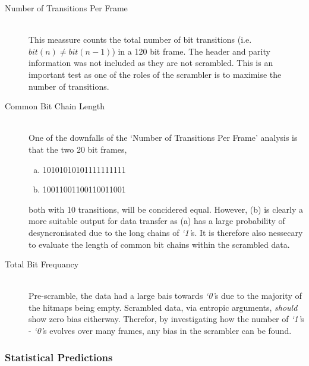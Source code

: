 			\begin{description}
				\item[Number of Transitions Per Frame] \hfill \\
					This meassure counts the total number of bit transitions (i.e. $bit(n) \neq bit(n-1)$) in a 120 bit frame. 
					The header and parity information was not included as they are not scrambled.
					This is an important test as one of the roles of the scrambler is to maximise the number of transitions.

				\item[Common Bit Chain Length] \hfill \\
					One of the downfalls of the `Number of Transitions Per Frame' analysis is that the two 20 bit frames,

					\begin{enumerate}[a)]
						\item 10101010101111111111
						\item 10011001100110011001
					\end{enumerate}

					both with 10 transitions, will be concidered equal. However, (b) is clearly a more suitable output for data transfer as (a) has a large probability of desyncronisated due to the long chains of \textit{`1'}s.
					It is therefore also nessecary to evaluate the length of common bit chains within the scrambled data. 

				\item[Total Bit Frequancy] \hfill \\
					Pre-scramble, the data had a large bais towards \textit{`0'}s due to the majority of the hitmaps being empty.
					Scrambled data, via entropic arguments, \textit{should} show zero bias eitherway.
					Therefor, by investigating how the number of \textit{`1'}s - \textit{`0'}s evolves over many frames, any bias in the scrambler can be found.

			\end{description}	

		\subsubsection{Statistical Predictions} %
		\label{subsub:statistical_predictions}

